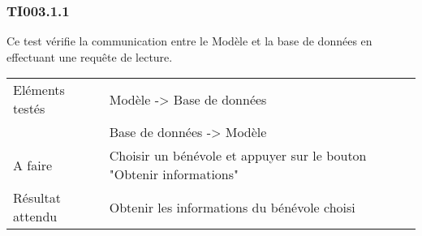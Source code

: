 
\subsubsection{TI003.1.1}
  		Ce test vérifie la communication entre le Modèle et la base de données en effectuant une requête de lecture.
  		\begin{center}
    	 		\begin{tabular}[h]{|p{}|p{}|}
			\hline
				Eléments testés & Modèle -> Base de données  \\
							    &  Base de données -> Modèle \\\hline
    				A faire & Choisir un bénévole et appuyer sur le bouton "Obtenir informations" \\\hline
    				Résultat attendu & Obtenir les informations du bénévole choisi \\\hline
     		\end{tabular}
  		\end{center}	